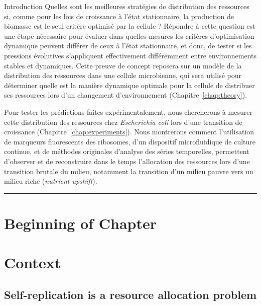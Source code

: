 \begin{chapter_summary}{Introduction}
Quelles sont les meilleures stratégies de distribution des ressources si, comme pour les lois de croissance à l'état stationnaire, la production de biomasse est le seul critère optimisé par la cellule ?
Répondre à cette question est une étape nécessaire pour évaluer dans quelles mesures les critères d'optimisation dynamique peuvent différer de ceux à l'état stationnaire, et donc, de tester si les pressions évolutives s'appliquent effectivement différemment entre environnements stables et dynamiques.
Cette preuve de concept reposera sur un modèle de la distribution des ressources dans une cellule microbienne, qui sera utilisé pour déterminer quelle est la manière dynamique optimale pour la cellule de distribuer ses ressources lors d'un changement d'environnement (Chapitre~\ref{chap:theory}).

Pour tester les prédictions faites expérimentalement, nous chercherons à mesurer cette distribution des ressources chez \textit{Escherichia coli} lors d'une transition de croissance (Chapitre~\ref{chap:experiments}).
Nous montrerons comment l'utilisation de marqueurs fluorescents des ribosomes, d'un dispositif microfluidique de culture continue, et de méthodes originales d'analyse des séries temporelles, permettent d'observer et de reconstruire dans le temps l'allocation des ressources lors d'une transition brutale du milieu, notamment la transition d'un milieu pauvre vers un milieu riche (\textit{nutrient upshift}).
\end{chapter_summary}

\begin{center}
\noindent\rule{4cm}{0.1pt}
\end{center}

\section*{Beginning of Chapter \thechapter}
\section{Context}
\label{sec:context}

\subsection{Self-replication is a resource allocation problem}

